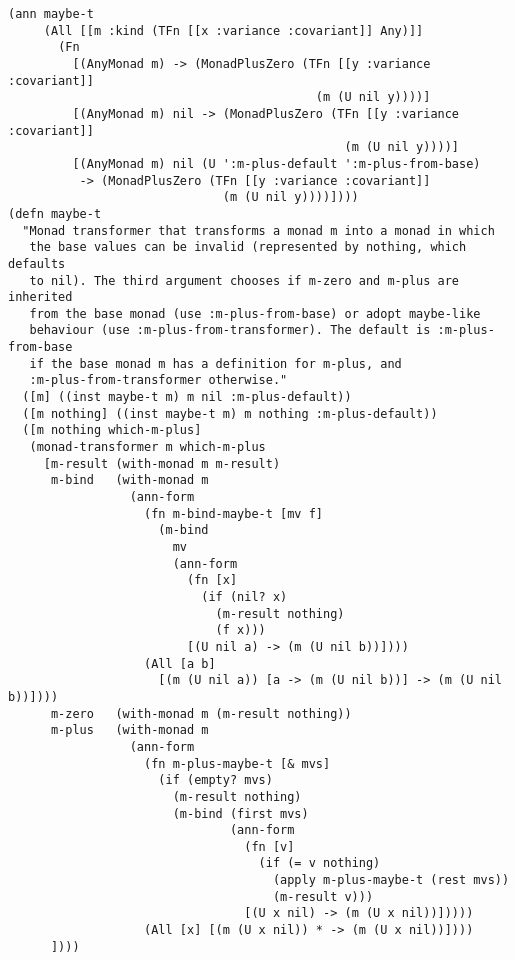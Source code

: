 \begin{lstlisting}[caption={Maybe monad transformer in Typed Clojure}, label=lst:maybet]
(ann maybe-t
     (All [[m :kind (TFn [[x :variance :covariant]] Any)]]
       (Fn 
         [(AnyMonad m) -> (MonadPlusZero (TFn [[y :variance :covariant]]
                                           (m (U nil y))))]
         [(AnyMonad m) nil -> (MonadPlusZero (TFn [[y :variance :covariant]]
                                               (m (U nil y))))]
         [(AnyMonad m) nil (U ':m-plus-default ':m-plus-from-base)
          -> (MonadPlusZero (TFn [[y :variance :covariant]]
                              (m (U nil y))))])))
(defn maybe-t
  "Monad transformer that transforms a monad m into a monad in which
   the base values can be invalid (represented by nothing, which defaults
   to nil). The third argument chooses if m-zero and m-plus are inherited
   from the base monad (use :m-plus-from-base) or adopt maybe-like
   behaviour (use :m-plus-from-transformer). The default is :m-plus-from-base
   if the base monad m has a definition for m-plus, and
   :m-plus-from-transformer otherwise."
  ([m] ((inst maybe-t m) m nil :m-plus-default))
  ([m nothing] ((inst maybe-t m) m nothing :m-plus-default))
  ([m nothing which-m-plus]
   (monad-transformer m which-m-plus
     [m-result (with-monad m m-result)
      m-bind   (with-monad m
                 (ann-form
                   (fn m-bind-maybe-t [mv f]
                     (m-bind
                       mv
                       (ann-form
                         (fn [x]
                           (if (nil? x)
                             (m-result nothing) 
                             (f x)))
                         [(U nil a) -> (m (U nil b))])))
                   (All [a b]
                     [(m (U nil a)) [a -> (m (U nil b))] -> (m (U nil b))])))
      m-zero   (with-monad m (m-result nothing))
      m-plus   (with-monad m
                 (ann-form
                   (fn m-plus-maybe-t [& mvs]
                     (if (empty? mvs)
                       (m-result nothing)
                       (m-bind (first mvs)
                               (ann-form
                                 (fn [v]
                                   (if (= v nothing)
                                     (apply m-plus-maybe-t (rest mvs))
                                     (m-result v)))
                                 [(U x nil) -> (m (U x nil))]))))
                   (All [x] [(m (U x nil)) * -> (m (U x nil))])))
      ])))

\end{lstlisting}

